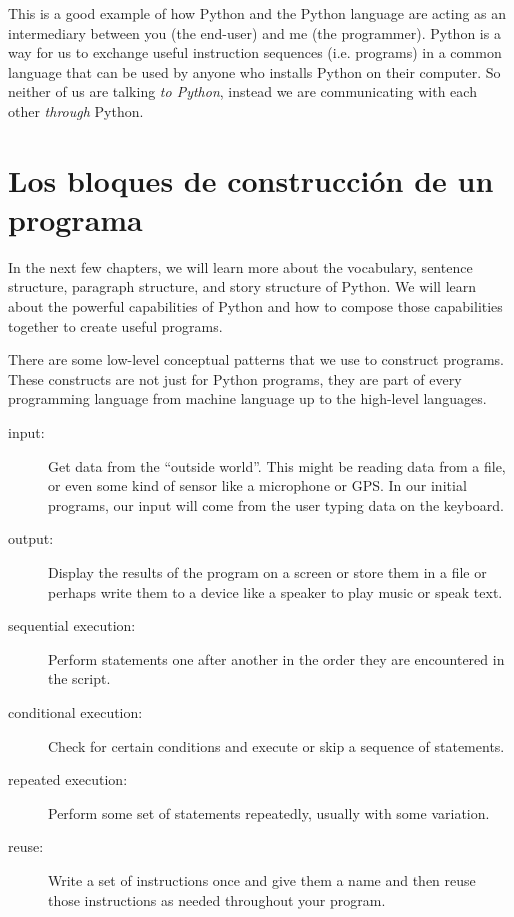 This is a good example of how Python and the Python language are acting as an intermediary
between you (the end-user) and me (the programmer).  Python is a way for us to exchange useful
instruction sequences (i.e. programs) in a common language that can be used by anyone who 
installs Python on their computer.  So neither of us are talking {\em to Python},
instead we are communicating with each other {\em through} Python.

\section{Los bloques de construcci\'on de un programa}

In the next few chapters, we will learn more about the vocabulary, sentence structure,
paragraph structure, and story structure of Python.  We will learn about the powerful
capabilities of Python and how to compose those capabilities together to create useful
programs.

There are some low-level conceptual patterns that we use to construct programs.  These
constructs are not just for Python programs, they are part of every programming language
from machine language up to the high-level languages.

\begin{description}

\item[input:] Get data from the ``outside world''.  This might be 
reading data from a file, or even some kind of sensor like 
a microphone or GPS.  In our initial programs, our input will come from the user
typing data on the keyboard.

\item[output:] Display the results of the program on a screen
or store them in a file or perhaps write them to a device like a
speaker to play music or speak text.

\item[sequential execution:] Perform statements one after
another in the order they are encountered in the script.

\item[conditional execution:] Check for certain conditions and
execute or skip a sequence of statements.

\item[repeated execution:] Perform some set of statements 
repeatedly, usually with
some variation.

\item[reuse:] Write a set of instructions once and give them a name
and then reuse those instructions as needed throughout your program.

\end{description}

